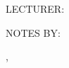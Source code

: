 \begin{titlepage}
    \begin{addmargin}[0cm]{1cm} %
        \begin{center}
            \vfill
            \hfill
            
            \Huge        
            \faCarrot 
            \vspace{1.5cm}
            
            \Large
            \MakeTextUppercase{\myUni}
            
            \vspace{0.2cm}
            \myDepartment
            
            \vspace{0.7cm}
            \textbf{\myDegree}
            
            \vspace{1.5cm}
            \huge
            \myCourse
            
            \large
            \vspace{2.5cm}
            \begin{flushleft}
                \MakeTextUppercase{lecturer:} \myLecturer
            \end{flushleft}
            \begin{flushright}
                \MakeTextUppercase{notes by:} \myName
            \end{flushright}
            
            \vfill
            \myLocation, \myYear
        \end{center}
    \end{addmargin}
 \end{titlepage}
